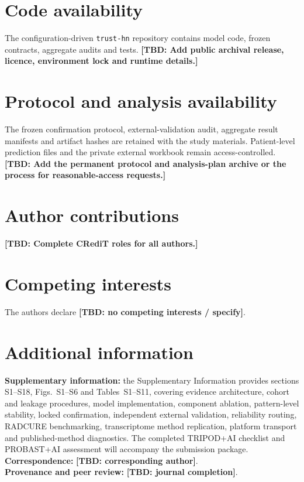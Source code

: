 \documentclass[pdflatex,sn-nature]{sn-jnl}
\newcommand{\TBD}[1]{\textcolor{draftred}{\textbf{[TBD: #1]}}}
\begin{document}
\section*{Code availability}
The configuration-driven \texttt{trust-hn} repository contains model code, frozen contracts, aggregate audits and tests. \TBD{Add public archival release, licence, environment lock and runtime details.}

\section*{Protocol and analysis availability}
The frozen confirmation protocol, external-validation audit, aggregate result manifests and artifact hashes are retained with the study materials. Patient-level prediction files and the private external workbook remain access-controlled. \TBD{Add the permanent protocol and analysis-plan archive or the process for reasonable-access requests.}

\section*{Author contributions}
\TBD{Complete CRediT roles for all authors.}

\section*{Competing interests}
The authors declare \TBD{no competing interests / specify}.

\section*{Additional information}
\textbf{Supplementary information:} the Supplementary Information provides sections S1--S18, Figs.~S1--S6 and Tables~S1--S11, covering evidence architecture, cohort and leakage procedures, model implementation, component ablation, pattern-level stability, locked confirmation, independent external validation, reliability routing, RADCURE benchmarking, transcriptome method replication, platform transport and published-method diagnostics. The completed TRIPOD+AI checklist and PROBAST+AI assessment will accompany the submission package.\\
\textbf{Correspondence:} \TBD{corresponding author}.\\
\textbf{Provenance and peer review:} \TBD{journal completion}.

\clearpage
\end{document}

